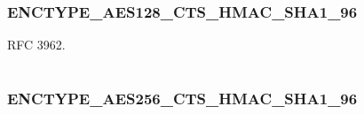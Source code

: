 \documentclass[letterpaper,10pt,english]{sphinxmanual}
\begin{document}
\begin{fulllineitems}
\label{appdev/refs/macros/CKSUMTYPE_RSA_MD5_DES:CKSUMTYPE_RSA_MD5_DES}
\end{fulllineitems}


\begin{tabulary}{\linewidth}{|L|L|}
\hline

 & 
\\
\hline\end{tabulary}



\subsubsection{ENCTYPE\_AES128\_CTS\_HMAC\_SHA1\_96}
\label{appdev/refs/macros/ENCTYPE_AES128_CTS_HMAC_SHA1_96:enctype-aes128-cts-hmac-sha1-96-data}\label{appdev/refs/macros/ENCTYPE_AES128_CTS_HMAC_SHA1_96::doc}\label{appdev/refs/macros/ENCTYPE_AES128_CTS_HMAC_SHA1_96:enctype-aes128-cts-hmac-sha1-96}

\begin{fulllineitems}
\label{appdev/refs/macros/ENCTYPE_AES128_CTS_HMAC_SHA1_96:ENCTYPE_AES128_CTS_HMAC_SHA1_96}
\end{fulllineitems}


RFC 3962.

\begin{tabulary}{\linewidth}{|L|L|}
\hline

 & 
\\
\hline\end{tabulary}



\subsubsection{ENCTYPE\_AES256\_CTS\_HMAC\_SHA1\_96}
\label{appdev/refs/macros/ENCTYPE_AES256_CTS_HMAC_SHA1_96:enctype-aes256-cts-hmac-sha1-96-data}\label{appdev/refs/macros/ENCTYPE_AES256_CTS_HMAC_SHA1_96::doc}\label{appdev/refs/macros/ENCTYPE_AES256_CTS_HMAC_SHA1_96:enctype-aes256-cts-hmac-sha1-96}

\begin{fulllineitems}
\label{appdev/refs/macros/ENCTYPE_AES256_CTS_HMAC_SHA1_96:ENCTYPE_AES256_CTS_HMAC_SHA1_96}
\end{fulllineitems}
\end{document}
